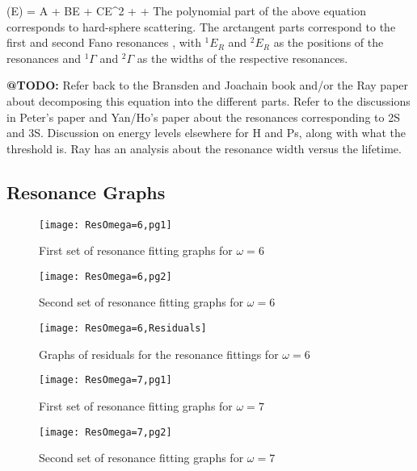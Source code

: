 \documentclass[Dissertation.tex]{subfiles}
\begin{document}
\beq
\label{eq:ResonanceCurve}
\delta(E) = A + BE + CE^2 + \arctan{} + \arctan{}
\eeq
The polynomial part of the above equation corresponds to hard-sphere scattering. The arctangent parts correspond to the first and second Fano resonances \cite{Fano1961,Macek1970,Hazi1979}, with $^1E_R$ and $^2E_R$ as the positions of the resonances and $^1\Gamma$ and $^2\Gamma$ as the widths of the respective resonances.

\textbf{@TODO:} Refer back to the Bransden and Joachain book and/or the Ray paper about decomposing this equation into the different parts. Refer to the discussions in Peter's paper and Yan/Ho's paper about the resonances corresponding to 2S and 3S.  Discussion on energy levels elsewhere for H and Ps, along with what the threshold is. Ray has an analysis about the resonance width versus the lifetime.
\subsection{Resonance Graphs}
\label{sec:ResonanceGraphs}

\begin{figure}[H]
	\centering
	\texttt{[image: ResOmega=6,pg1]}
	\caption{First set of resonance fitting graphs for $\omega = 6$}
	\label{fig:ResOmega=6,pg1}
\end{figure}

\begin{figure}[H]
	\centering
	\texttt{[image: ResOmega=6,pg2]}
	\caption{Second set of resonance fitting graphs for $\omega = 6$}
	\label{fig:ResOmega=6,pg2}
\end{figure}

\begin{figure}[H]
	\centering
	\texttt{[image: ResOmega=6,Residuals]}
	\caption{Graphs of residuals for the resonance fittings for $\omega = 6$}
	\label{fig:ResOmega=6,Residuals}
\end{figure}

\begin{figure}[H]
	\centering
	\texttt{[image: ResOmega=7,pg1]}
	\caption{First set of resonance fitting graphs for $\omega = 7$}
	\label{fig:ResOmega=7,pg1}
\end{figure}

\begin{figure}[H]
	\centering
	\texttt{[image: ResOmega=7,pg2]}
	\caption{Second set of resonance fitting graphs for $\omega = 7$}
	\label{fig:ResOmega=7,pg2}
\end{figure}
\end{document}
